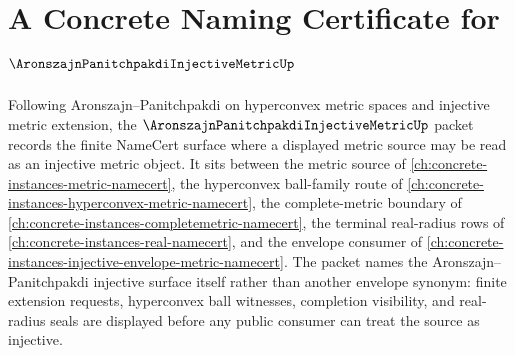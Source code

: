 \chapter{A Concrete Naming Certificate for $\AronszajnPanitchpakdiInjectiveMetricUp$}
\label{ch:concrete-instances-aronszajn-panitchpakdi-injective-metric-namecert}

Following Aronszajn--Panitchpakdi on hyperconvex metric spaces and injective metric extension, the $\AronszajnPanitchpakdiInjectiveMetricUp$ packet records the finite NameCert surface where a displayed metric source may be read as an injective metric object. It sits between the metric source of \autoref{ch:concrete-instances-metric-namecert}, the hyperconvex ball-family route of \autoref{ch:concrete-instances-hyperconvex-metric-namecert}, the complete-metric boundary of \autoref{ch:concrete-instances-completemetric-namecert}, the terminal real-radius rows of \autoref{ch:concrete-instances-real-namecert}, and the envelope consumer of \autoref{ch:concrete-instances-injective-envelope-metric-namecert}. The packet names the Aronszajn--Panitchpakdi injective surface itself rather than another envelope synonym: finite extension requests, hyperconvex ball witnesses, completion visibility, and real-radius seals are displayed before any public consumer can treat the source as injective.

